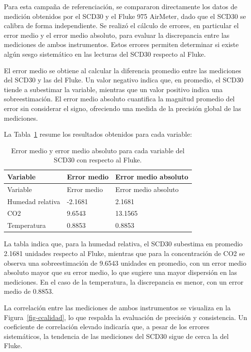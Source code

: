 \documentclass[
  letterpaper,
]{scrbook}
\begin{document}
Para esta campaña de referenciación, se compararon directamente los
datos de medición obtenidos por el SCD30 y el Fluke 975 AirMeter, dado
que el SCD30 se calibra de forma independiente. Se realizó el cálculo de
errores, en particular el error medio y el error medio absoluto, para
evaluar la discrepancia entre las mediciones de ambos instrumentos.
Estos errores permiten determinar si existe algún sesgo sistemático en
las lecturas del SCD30 respecto al Fluke.

El error medio se obtiene al calcular la diferencia promedio entre las
mediciones del SCD30 y las del Fluke. Un valor negativo indica que, en
promedio, el SCD30 tiende a subestimar la variable, mientras que un
valor positivo indica una sobreestimación. El error medio absoluto
cuantifica la magnitud promedio del error sin considerar el signo,
ofreciendo una medida de la precisión global de las mediciones.

La Tabla~\ref{tbl-error-calidad} resume los resultados obtenidos para
cada variable:

\begin{longtable}[]{@{}lll@{}}
\caption{Error medio y error medio absoluto para cada variable del SCD30
con respecto al Fluke.}\label{tbl-error-calidad}\tabularnewline
\toprule\noalign{}
Variable & Error medio & Error medio absoluto \\
\midrule\noalign{}
\endfirsthead
\toprule\noalign{}
Variable & Error medio & Error medio absoluto \\
\midrule\noalign{}
\endhead
\bottomrule\noalign{}
\endlastfoot
Humedad relativa & -2.1681 & 2.1681 \\
CO2 & 9.6543 & 13.1565 \\
Temperatura & 0.8853 & 0.8853 \\
\end{longtable}

La tabla indica que, para la humedad relativa, el SCD30 subestima en
promedio 2.1681 unidades respecto al Fluke, mientras que para la
concentración de CO2 se observa una sobreestimación de 9.6543 unidades
en promedio, con un error medio absoluto mayor que su error medio, lo
que sugiere una mayor dispersión en las mediciones. En el caso de la
temperatura, la discrepancia es menor, con un error medio de 0.8853.

La correlación entre las mediciones de ambos instrumentos se visualiza
en la Figura~\ref{fig-ccalidad}, lo que respalda la evaluación de
precisión y consistencia. Un coeficiente de correlación elevado
indicaría que, a pesar de los errores sistemáticos, la tendencia de las
mediciones del SCD30 sigue de cerca la del Fluke.
\end{document}
